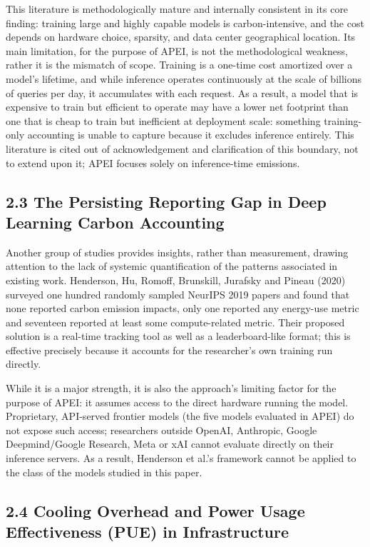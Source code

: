 \documentclass[11pt]{article}
\begin{document}
This literature is methodologically mature and internally consistent in its core finding: training large and highly capable models is carbon-intensive, and the cost depends on hardware choice, sparsity, and data center geographical location. Its main limitation, for the purpose of APEI, is not the methodological weakness, rather it is the mismatch of scope. Training is a one-time cost amortized over a model's lifetime, and while inference operates continuously at the scale of billions of queries per day, it accumulates with each request. As a result, a model that is expensive to train but efficient to operate may have a lower net footprint than one that is cheap to train but inefficient at deployment scale: something training-only accounting is unable to capture because it excludes inference entirely. This literature is cited out of acknowledgement and clarification of this boundary, not to extend upon it; APEI focuses solely on inference-time emissions.

\subsection*{2.3 The Persisting Reporting Gap in Deep Learning Carbon Accounting}

Another group of studies provides insights, rather than measurement, drawing attention to the lack of systemic quantification of the patterns associated in existing work. Henderson, Hu, Romoff, Brunskill, Jurafsky and Pineau (2020) surveyed one hundred randomly sampled NeurIPS 2019 papers and found that none reported carbon emission impacts, only one reported any energy-use metric and seventeen reported at least some compute-related metric. Their proposed solution is a real-time tracking tool as well as a leaderboard-like format; this is effective precisely because it accounts for the researcher's own training run directly.

While it is a major strength, it is also the approach's limiting factor for the purpose of APEI: it assumes access to the direct hardware running the model. Proprietary, API-served frontier models (the five models evaluated in APEI) do not expose such access; researchers outside OpenAI, Anthropic, Google Deepmind/Google Research, Meta or xAI cannot evaluate directly on their inference servers. As a result, Henderson et al.'s framework cannot be applied to the class of the models studied in this paper.

\subsection*{2.4 Cooling Overhead and Power Usage Effectiveness (PUE) in Infrastructure}
\end{document}
